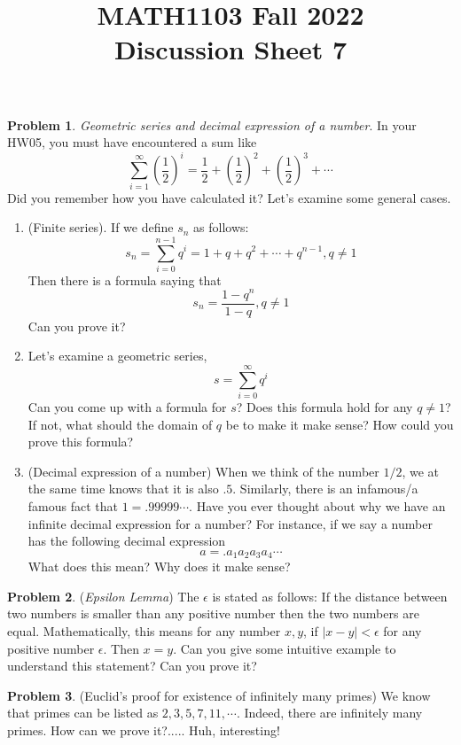 \documentclass[11pt,oneside]{amsart}
\title{MATH1103 Fall 2022\\
Discussion Sheet 7}
\theoremstyle{definition}
\newtheorem{problem}{Problem}
\begin{document}
    \maketitle

    \begin{problem}\textit{Geometric series and decimal expression of a number}. In your HW05, you must have encountered a sum like
    $$
    \sum_{i=1}^\infty (\frac{1}{2})^i=\frac{1}{2}+(\frac{1}{2})^2+(\frac{1}{2})^3+\cdots
    $$
    Did you remember how you have calculated it? Let's examine some general cases.
        \begin{enumerate}
         \item (Finite series). If we define $s_n$ as follows:
         $$
         s_n=\sum_{i=0}^{n-1} q^i=1+q+q^2+\cdots+q^{n-1}, q \not = 1
         $$
         Then there is a formula saying that 
         $$
         s_n=\frac{1-q^n}{1-q},q \not = 1
         $$
         Can you prove it?
         \vfill
         \item Let's examine a geometric series,
         $$
         s=\sum_{i=0}^\infty q^i
         $$
         Can you come up with a formula for $s$? Does this formula hold for any $q \not=1$? If not, what should the domain of $q$ be to make it make sense? How could you prove this formula?
         \vfill
         \item (Decimal expression of a number)
         \newline
         When we think of the number $1/2$, we at the same time knows that it is also $.5$. Similarly, there is an infamous/a famous fact that $1=.99999\cdots$. Have you ever thought about why we have an infinite decimal expression for a number? For instance, if we say a number has the following decimal expression
         $$
         a=.a_1a_2a_3a_4\cdots
         $$
         What does this mean? Why does it make sense?
         \vfill
         \end{enumerate}
    \end{problem}
    
    \begin{problem}(\textit{Epsilon Lemma})
    \newline
    The $\epsilon$ is stated as follows: If the distance between two numbers is smaller than any positive number then the two numbers are equal. 
    \newline
    Mathematically, this means for any number $x,y$, if $|x-y|<\epsilon$ for any positive number $\epsilon$. Then $x=y$.
    \newline
    Can you give some intuitive example to understand this statement? Can you prove it?
    \vfill
    
    \end{problem}
    
    \begin{problem}(Euclid's proof for existence of infinitely many primes)
    \newline
    We know that primes can be listed as $2,3,5,7,11,\cdots$. Indeed, there are infinitely many primes. How can we prove it?..... Huh, interesting!
    \vfill
    \end{problem}

    
\end{document}
